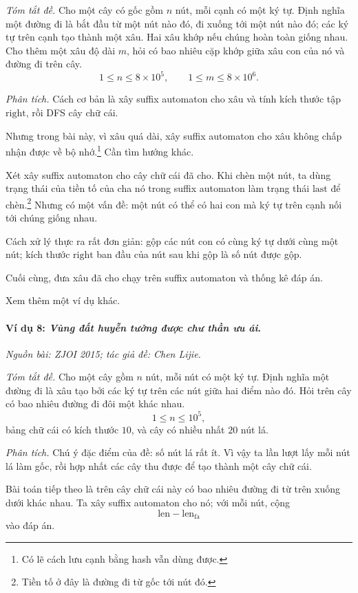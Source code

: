 \documentclass[11pt]{article}
\begin{document}
\emph{Tóm tắt đề.}
Cho một cây có gốc gồm \(n\) nút, mỗi cạnh có một ký tự. Định nghĩa một đường
đi là bắt đầu từ một nút nào đó, đi xuống tới một nút nào đó; các ký tự trên
cạnh tạo thành một xâu. Hai xâu khớp nếu chúng hoàn toàn giống nhau. Cho thêm
một xâu độ dài \(m\), hỏi có bao nhiêu cặp khớp giữa xâu con của nó và đường đi
trên cây.
\[
  1\le n\le 8\times 10^5,\qquad 1\le m\le 8\times 10^6.
\]

\emph{Phân tích.}
Cách cơ bản là xây suffix automaton cho xâu và tính kích thước tập
\(\mathrm{right}\), rồi DFS cây chữ cái.

Nhưng trong bài này, vì xâu quá dài, xây suffix automaton cho xâu không chấp
nhận được về bộ nhớ.\footnote{Có lẽ cách lưu cạnh bằng hash vẫn dùng được.}
Cần tìm hướng khác.

Xét xây suffix automaton cho cây chữ cái đã cho. Khi chèn một nút, ta dùng trạng
thái của tiền tố của cha nó trong suffix automaton làm trạng thái
\(\mathrm{last}\) để chèn.\footnote{Tiền tố ở đây là đường đi từ gốc tới nút
đó.} Nhưng có một vấn đề: một nút có thể có hai con mà ký tự trên cạnh nối tới
chúng giống nhau.

Cách xử lý thực ra rất đơn giản: gộp các nút con có cùng ký tự dưới cùng một
nút; kích thước \(\mathrm{right}\) ban đầu của nút sau khi gộp là số nút được
gộp.

Cuối cùng, đưa xâu đã cho chạy trên suffix automaton và thống kê đáp án.

Xem thêm một ví dụ khác.

\paragraph{Ví dụ 8: \emph{Vùng đất huyễn tưởng được chư thần ưu ái}.}
\emph{Nguồn bài: ZJOI 2015; tác giả đề: Chen Lijie.}

\emph{Tóm tắt đề.}
Cho một cây gồm \(n\) nút, mỗi nút có một ký tự. Định nghĩa một đường đi là xâu
tạo bởi các ký tự trên các nút giữa hai điểm nào đó. Hỏi trên cây có bao nhiêu
đường đi đôi một khác nhau.
\[
  1\le n\le 10^5,
\]
bảng chữ cái có kích thước \(10\), và cây có nhiều nhất \(20\) nút lá.

\emph{Phân tích.}
Chú ý đặc điểm của đề: số nút lá rất ít. Vì vậy ta lần lượt lấy mỗi nút lá làm
gốc, rồi hợp nhất các cây thu được để tạo thành một cây chữ cái.

Bài toán tiếp theo là trên cây chữ cái này có bao nhiêu đường đi từ trên xuống
dưới khác nhau. Ta xây suffix automaton cho nó; với mỗi nút, cộng
\[
  \mathrm{len}-\mathrm{len}_{\mathrm{fa}}
\]
vào đáp án.
\end{document}
